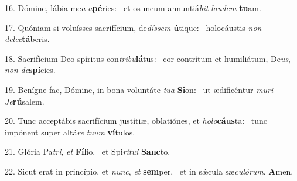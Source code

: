 16. Dómine, lábia me\textit{a} \textit{a}\textbf{pé}ries: \ast\  et os meum annuntiá\textit{bit} \textit{lau}\textit{dem} \textbf{tu}am.\

17. Quóniam si voluísses sacrifícium, de\textit{dís}\textit{sem} \textbf{ú}tique: \ast\  holocáustis \textit{non} \textit{de}\textit{lec}\textbf{tá}beris.\

18. Sacrifícium Deo spíritus con\textit{tri}\textit{bu}\textbf{lá}tus: \ast\  cor contrítum et humiliátum, De\textit{us}, \textit{non} \textit{de}\textbf{spí}cies.\

19. Benígne fac, Dómine, in bona voluntáte \textit{tu}\textit{a} \textbf{Si}on: \ast\  ut ædificéntur \textit{mu}\textit{ri} \textit{Je}\textbf{rú}salem.\

20. Tunc acceptábis sacrifícium justítiæ, oblatiónes, et \textit{ho}\textit{lo}\textbf{cáus}ta: \ast\  tunc impónent super altá\textit{re} \textit{tu}\textit{um} \textbf{ví}tulos.\

21. Glória Pa\textit{tri}, \textit{et} \textbf{Fí}lio, \ast\  et Spi\textit{rí}\textit{tu}\textit{i} \textbf{Sanc}to.\

22. Sicut erat in princípio, et \textit{nunc}, \textit{et} \textbf{sem}per, \ast\  et in sǽcula sæ\textit{cu}\textit{ló}\textit{rum}. \textbf{A}men.\

